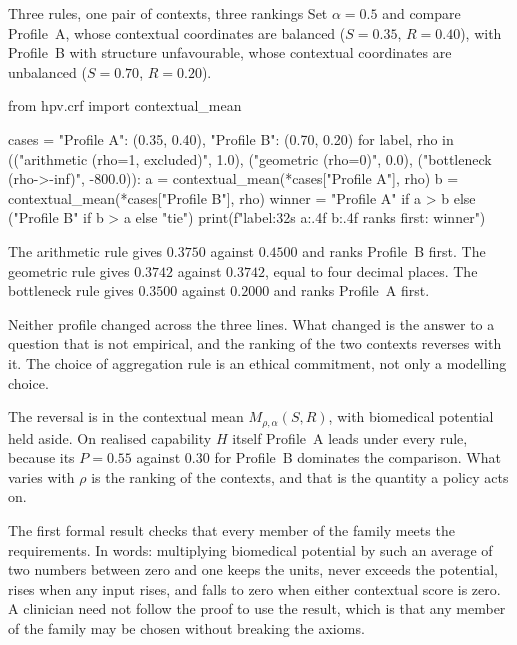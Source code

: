 \begin{workedexample}{Three rules, one pair of contexts, three rankings}
Set $\alpha=0.5$ and compare Profile~A, whose contextual coordinates are
balanced ($S=0.35$, $R=0.40$), with Profile~B with structure unfavourable, whose
contextual coordinates are unbalanced ($S=0.70$, $R=0.20$).

\begin{wecode}[Python]
from hpv.crf import contextual_mean

cases = {"Profile A": (0.35, 0.40), "Profile B": (0.70, 0.20)}
for label, rho in (("arithmetic (rho=1, excluded)", 1.0),
                   ("geometric  (rho=0)", 0.0),
                   ("bottleneck (rho->-inf)", -800.0)):
    a = contextual_mean(*cases["Profile A"], rho)
    b = contextual_mean(*cases["Profile B"], rho)
    winner = "Profile A" if a > b else ("Profile B" if b > a else "tie")
    print(f"{label:32s} {a:.4f}  {b:.4f}   ranks first: {winner}")
\end{wecode}

\noindent The arithmetic rule gives $0.3750$ against $0.4500$ and ranks
Profile~B first. The geometric rule gives $0.3742$ against $0.3742$, equal to
four decimal places. The bottleneck rule gives $0.3500$ against $0.2000$ and
ranks Profile~A first.

Neither profile changed across the three lines. What changed is the answer to a
question that is not empirical, and the ranking of the two contexts reverses
with it. The choice of aggregation rule is an ethical commitment, not only a
modelling choice.

The reversal is in the contextual mean $M_{\rho,\alpha}(S,R)$, with biomedical
potential held aside. On realised capability $H$ itself Profile~A leads under
every rule, because its $P=0.55$ against $0.30$ for Profile~B dominates the
comparison. What varies with $\rho$ is the ranking of the contexts, and that is
the quantity a policy acts on.

\end{workedexample}

The first formal result checks that every member of the family meets the
requirements. In words: multiplying biomedical potential by such an average of
two numbers between zero and one keeps the units, never exceeds the potential,
rises when any input rises, and falls to zero when either contextual score is
zero. A clinician need not follow the proof to use the result, which is that any
member of the family may be chosen without breaking the axioms.

